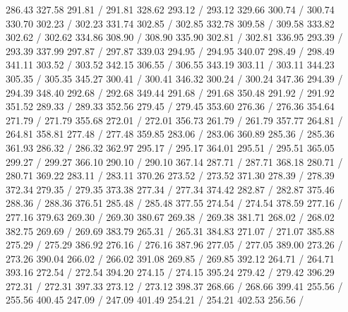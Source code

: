 { 286.43 327.58 291.81 /
 291.81 328.62 293.12 /
 293.12 329.66 300.74 /
 300.74 330.70 302.23 /
 302.23 331.74 302.85 /
 302.85 332.78 309.58 /
 309.58 333.82 302.62 /
 302.62 334.86 308.90 /
 308.90 335.90 302.81 /
 302.81 336.95 293.39 /
 293.39 337.99 297.87 /
 297.87 339.03 294.95 /
 294.95 340.07 298.49 /
 298.49 341.11 303.52 /
 303.52 342.15 306.55 /
 306.55 343.19 303.11 /
 303.11 344.23 305.35 /
 305.35 345.27 300.41 /
 300.41 346.32 300.24 /
 300.24 347.36 294.39 /
 294.39 348.40 292.68 /
 292.68 349.44 291.68 /
 291.68 350.48 291.92 /
 291.92 351.52 289.33 /
 289.33 352.56 279.45 /
 279.45 353.60 276.36 /
 276.36 354.64 271.79 /
 271.79 355.68 272.01 /
 272.01 356.73 261.79 /
 261.79 357.77 264.81 /
 264.81 358.81 277.48 /
 277.48 359.85 283.06 /
 283.06 360.89 285.36 /
 285.36 361.93 286.32 /
 286.32 362.97 295.17 /
 295.17 364.01 295.51 /
 295.51 365.05 299.27 /
 299.27 366.10 290.10 /
 290.10 367.14 287.71 /
 287.71 368.18 280.71 /
 280.71 369.22 283.11 /
 283.11 370.26 273.52 /
 273.52 371.30 278.39 /
 278.39 372.34 279.35 /
 279.35 373.38 277.34 /
 277.34 374.42 282.87 /
 282.87 375.46 288.36 /
 288.36 376.51 285.48 /
 285.48 377.55 274.54 /
 274.54 378.59 277.16 /
 277.16 379.63 269.30 /
 269.30 380.67 269.38 /
 269.38 381.71 268.02 /
 268.02 382.75 269.69 /
 269.69 383.79 265.31 /
 265.31 384.83 271.07 /
 271.07 385.88 275.29 /
 275.29 386.92 276.16 /
 276.16 387.96 277.05 /
 277.05 389.00 273.26 /
 273.26 390.04 266.02 /
 266.02 391.08 269.85 /
 269.85 392.12 264.71 /
 264.71 393.16 272.54 /
 272.54 394.20 274.15 /
 274.15 395.24 279.42 /
 279.42 396.29 272.31 /
 272.31 397.33 273.12 /
 273.12 398.37 268.66 /
 268.66 399.41 255.56 /
 255.56 400.45 247.09 /
 247.09 401.49 254.21 /
 254.21 402.53 256.56 /
}
